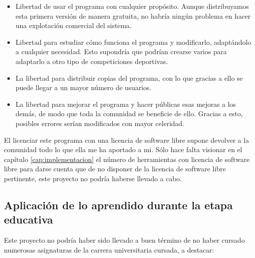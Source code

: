\begin{itemize}
\item Libertad de usar el programa con cualquier propósito. Aunque distribuyamos
  esta primera versión de manera gratuita, no habría ningún problema en hacer
  una explotación comercial del sistema.
\item Libertad para estudiar cómo funciona el programa y modificarlo,
  adaptándolo a cualquier necesidad. Esto supondría que podrían crearse varios
   para adaptarlo a otro tipo de competiciones deportivas.
\item La libertad para distribuir copias del programa, con lo que gracias a ello
  se puede llegar a un mayor número de usuarios.
\item La libertad para mejorar el programa y hacer públicas esas mejoras a los
  demás, de modo que toda la comunidad se beneficie de ello. Gracias a esto,
  posibles errores serían modificados con mayor celeridad.
\end{itemize}

El licenciar este programa con una licencia de software libre supone devolver a
la comunidad todo lo que ella me ha aportado a mi. Sólo hace falta visionar en
el capítulo \ref{cap:implementacion} el número de herramientas con licencia de
software libre para darse cuenta que de no disponer de la licencia de software
libre pertinente, este proyecto no podría haberse llevado a cabo.

\subsection{Aplicación de lo aprendido durante la etapa educativa}
Este proyecto no podría haber sido llevado a buen término de no haber cursado
numerosas asignaturas de la carrera universitaria cursada, a destacar:

